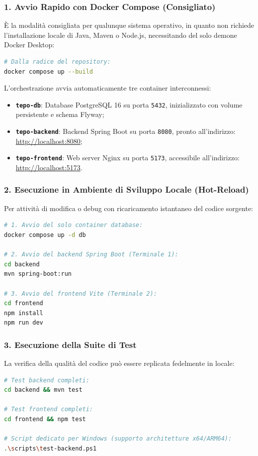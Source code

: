 \subsubsection{1. Avvio Rapido con Docker Compose (Consigliato)}
È la modalità consigliata per qualunque sistema operativo, in quanto non richiede l'installazione locale di Java, Maven o Node.js, necessitando del solo demone Docker Desktop:
\begin{lstlisting}[language=bash]
# Dalla radice del repository:
docker compose up --build
\end{lstlisting}
L'orchestrazione avvia automaticamente tre container interconnessi:
\begin{itemize}[leftmargin=1.4em, itemsep=0.25em]
    \item \textbf{\texttt{tepo-db}}: Database PostgreSQL 16 su porta \texttt{5432}, inizializzato con volume persistente e schema Flyway;
    \item \textbf{\texttt{tepo-backend}}: Backend Spring Boot su porta \texttt{8080}, pronto all'indirizzo:\\
    \mbox{\url{http://localhost:8080}};
    \item \textbf{\texttt{tepo-frontend}}: Web server Nginx su porta \texttt{5173}, accessibile all'indirizzo:\\
    \mbox{\url{http://localhost:5173}}.
\end{itemize}

\subsubsection{2. Esecuzione in Ambiente di Sviluppo Locale (Hot-Reload)}
Per attività di modifica o debug con ricaricamento istantaneo del codice sorgente:
\begin{lstlisting}[language=bash]
# 1. Avvio del solo container database:
docker compose up -d db

# 2. Avvio del backend Spring Boot (Terminale 1):
cd backend
mvn spring-boot:run

# 3. Avvio del frontend Vite (Terminale 2):
cd frontend
npm install
npm run dev
\end{lstlisting}

\subsubsection{3. Esecuzione della Suite di Test}
La verifica della qualità del codice può essere replicata fedelmente in locale:
\begin{lstlisting}[language=bash]
# Test backend completi:
cd backend && mvn test

# Test frontend completi:
cd frontend && npm test

# Script dedicato per Windows (supporto architetture x64/ARM64):
.\scripts\test-backend.ps1
\end{lstlisting}
